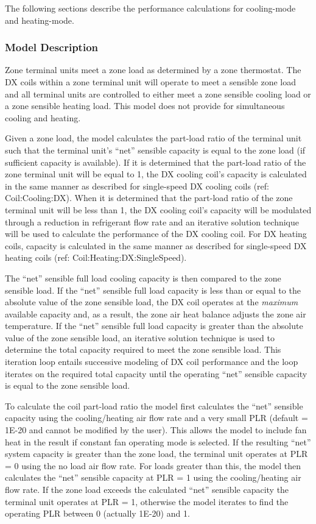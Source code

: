 The following sections describe the performance calculations for cooling-mode and heating-mode.

\subsubsection{Model Description}\label{model-description-4-002}

Zone terminal units meet a zone load as determined by a zone thermostat. The DX coils within a zone terminal unit will operate to meet a sensible zone load and all terminal units are controlled to either meet a zone sensible cooling load or a zone sensible heating load. This model does not provide for simultaneous cooling and heating.

Given a zone load, the model calculates the part-load ratio of the terminal unit such that the terminal unit's ``net'' sensible capacity is equal to the zone load (if sufficient capacity is available). If it is determined that the part-load ratio of the zone terminal unit will be equal to 1, the DX cooling coil's capacity is calculated in the same manner as described for single-speed DX cooling coils (ref: Coil:Cooling:DX). When it is determined that the part-load ratio of the zone terminal unit will be less than 1, the DX cooling coil's capacity will be modulated through a reduction in refrigerant flow rate and an iterative solution technique will be used to calculate the performance of the DX cooling coil. For DX heating coils, capacity is calculated in the same manner as described for single-speed DX heating coils (ref: Coil:Heating:DX:SingleSpeed).

The ``net'' sensible full load cooling capacity is then compared to the zone sensible load. If the ``net'' sensible full load capacity is less than or equal to the absolute value of the zone sensible load, the DX coil operates at the \emph{maximum} available capacity and, as a result, the zone air heat balance adjusts the zone air temperature. If the ``net'' sensible full load capacity is greater than the absolute value of the zone sensible load, an iterative solution technique is used to determine the total capacity required to meet the zone sensible load. This iteration loop entails successive modeling of DX coil performance and the loop iterates on the required total capacity until the operating ``net'' sensible capacity is equal to the zone sensible load.

To calculate the coil part-load ratio the model first calculates the ``net'' sensible capacity using the cooling/heating air flow rate and a very small PLR (default = 1E-20 and cannot be modified by the user). This allows the model to include fan heat in the result if constant fan operating mode is selected. If the resulting ``net'' system capacity is greater than the zone load, the terminal unit operates at PLR = 0 using the no load air flow rate. For loads greater than this, the model then calculates the ``net'' sensible capacity at PLR = 1 using the cooling/heating air flow rate. If the zone load exceeds the calculated ``net'' sensible capacity the terminal unit operates at PLR = 1, otherwise the model iterates to find the operating PLR between 0 (actually 1E-20) and 1.

